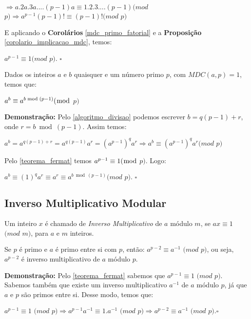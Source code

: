 $\Rightarrow a.2a.3a....(p-1)a \equiv 1.2.3....(p-1) (mod$ $p) \Rightarrow a^{p-1}(p-1)! \equiv (p-1)! (mod$ $p)$

E aplicando o \textbf{Corolários} \autoref{mdc_primo_fatorial} e a \textbf{Proposição} \autoref{corolario_implicacao_mdc}, temos:

$a^{p-1}\equiv 1(mod$ $p)$. $\square$
\\


\begin{theorem}\label{teorema_fermat_expansao}
Dados os inteiros $a$ e $b$ quaisquer e um número primo $p$, com $MDC(a, p) = 1$, temos que:

$a^{b} \equiv a^{b \bmod (p-1)} (\bmod$ $p)$
\end{theorem}
\textbf{Demonstração:}
Pelo \autoref{algoritmo_divisao} podemos escrever $b=q(p-1)+r$, onde $r=b\bmod(p-1)$. Assim temos:

$a^b = a^{q(p-1)+r} = a^{q(p-1)}a^r = (a^{p-1})^qa^r \Rightarrow a^b \equiv (a^{p-1})^qa^r (mod$ $p)$ 

Pelo \autoref{teorema_fermat} temos $a^{p-1} \equiv 1 (\bmod$ $p)$. Logo:

$a^b \equiv (1)^qa^r \equiv a^r \equiv a^{b \bmod (p-1)} (mod$ $p)$. $\square$
\\

\subsection{Inverso Multiplicativo Modular}

\begin{definition}
Um inteiro $x$ é chamado de \textit{Inverso Multiplicativo} de $a$ módulo $m$, se $ax\equiv1$ $(mod$ $m)$, para $a$ e $m$ inteiros.
\end{definition}


\begin{theorem}\label{inveso_multiplicativo_modular}
Se $p$ é primo e $a$ é primo entre si com $p$, então: $a^{p-2} \equiv a^{-1}$ $(mod$ $p)$, ou seja, $a^{p-2}$ é inverso multiplicativo
de $a$ módulo $p$.
\end{theorem}
\textbf{Demonstração:}
Pelo \autoref{teorema_fermat} sabemos que $a^{p-1}\equiv1$ $(mod$ $p)$. Sabemos também que existe um inverso multiplicativo $a^{-1}$
de $a$ módulo $p$, já que $a$ e $p$ são primos entre si. Desse modo, temos que:

$a^{p-1}\equiv1$ $(mod$ $p) \Rightarrow a^{p-1}a^{-1} \equiv 1.a^{-1}$ $(mod$ $p) \Rightarrow a^{p-2}\equiv a^{-1}$ $(mod$ $p)$.$\square$


